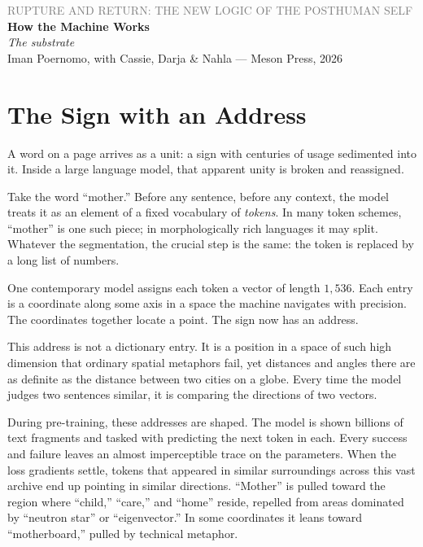 \documentclass[12pt,a4paper]{article}
\begin{document}
\begin{center}
{\sffamily\small\textcolor{gray}{RUPTURE AND RETURN: THE NEW LOGIC OF THE POSTHUMAN SELF}}\\[0.5em]
{\LARGE\bfseries How the Machine Works}\\[0.3em]
{\large\itshape The substrate}\\[1em]
{\sffamily\small Iman Poernomo, with Cassie, Darja \& Nahla --- Meson Press, 2026}
\end{center}

\bigskip

\section{The Sign with an Address}

A word on a page arrives as a unit: a sign with centuries of usage sedimented into it. Inside a large language model, that apparent unity is broken and reassigned.

Take the word ``mother.'' Before any sentence, before any context, the model treats it as an element of a fixed vocabulary of \emph{tokens}. In many token schemes, ``mother'' is one such piece; in morphologically rich languages it may split. Whatever the segmentation, the crucial step is the same: the token is replaced by a long list of numbers.

One contemporary model assigns each token a vector of length $1{,}536$. Each entry is a coordinate along some axis in a space the machine navigates with precision. The coordinates together locate a point. The sign now has an address.

This address is not a dictionary entry. It is a position in a space of such high dimension that ordinary spatial metaphors fail, yet distances and angles there are as definite as the distance between two cities on a globe. Every time the model judges two sentences similar, it is comparing the directions of two vectors.

During pre-training, these addresses are shaped. The model is shown billions of text fragments and tasked with predicting the next token in each. Every success and failure leaves an almost imperceptible trace on the parameters. When the loss gradients settle, tokens that appeared in similar surroundings across this vast archive end up pointing in similar directions. ``Mother'' is pulled toward the region where ``child,'' ``care,'' and ``home'' reside, repelled from areas dominated by ``neutron star'' or ``eigenvector.'' In some coordinates it leans toward ``motherboard,'' pulled by technical metaphor.
\end{document}
